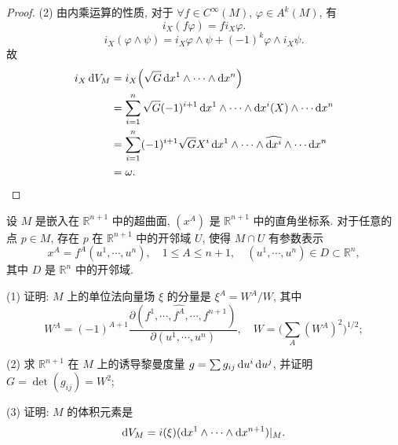 \begin{proof}
    (2) 由内乘运算的性质, 对于 $\forall f\in C^{\infty}(M)$, $\varphi\in A^k(M)$, 有
    \[i_X (f\varphi) = f i_X\varphi.\]
    \[i_X (\varphi\wedge\psi) = i_X\varphi\wedge\psi+(-1)^k \varphi\wedge i_X\psi.\]
    故
    \begin{align*}
      i_X \diff V_M
      & = i_X \Bigl(\sqrt{G}\diff x^1\wedge\cdots\wedge\diff x^n\Bigr) \\
      & = \sum_{i=1}^n \sqrt{G} (-1)^{i+1} \diff x^1\wedge\cdots\wedge\diff x^i(X)\wedge\cdots\diff x^n \\
      & = \sum_{i=1}^n (-1)^{i+1} \sqrt{G}X^i\diff x^1\wedge\cdots\wedge\widehat{\diff x^i}\wedge\cdots\diff x^n \\
      & = \omega.\qedhere
    \end{align*}
\end{proof}



\begin{exercise}
设 $M$ 是嵌入在 $\mathbb{R}^{n+1}$ 中的超曲面, $(x^A)$ 是 $\mathbb{R}^{n+1}$
中的直角坐标系. 对于任意的点 $p\in M$, 存在 $p$ 在 $\mathbb{R}^{n+1}$ 中的开邻域 $U$, 使得
$M\cap U$ 有参数表示
\[x^A=f^A(u^1,\cdots,u^n),\quad 1\leq A\leq n+1,\quad (u^1,\cdots,u^n)\in D\subset\mathbb{R}^n,\]
其中 $D$ 是 $\mathbb{R}^n$ 中的开邻域.

(1) 证明: $M$ 上的单位法向量场 $\xi$ 的分量是 $\xi^A=W^A/W$, 其中
\[W^A=(-1)^{A+1}\frac{\partial (f^1,\cdots,\widehat{f^A},\cdots,f^{n+1})}{\partial(u^1,\cdots,u^n)},
  \quad W=\biggl(\sum_A (W^A)^2\biggr)^{1/2};\]

(2) 求 $\mathbb{R}^{n+1}$ 在 $M$ 上的诱导黎曼度量 $g=\sum g_{ij}\mathop{}\!\mathrm{d} u^i\mathop{}\!\mathrm{d} u^j$, 并证明
$G=\det(g_{ij})=W^2$;

(3) 证明: $M$ 的体积元素是
\[\mathop{}\!\mathrm{d} V_M = i(\xi)(\mathop{}\!\mathrm{d} x^1\wedge\cdots\wedge\mathop{}\!\mathrm{d} x^{n+1})|_M.\]
\end{exercise}

